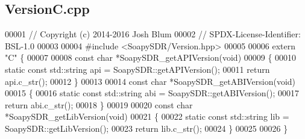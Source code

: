 \subsection{Version\+C.\+cpp}
\label{VersionC_8cpp_source}

\begin{DoxyCode}
00001 \textcolor{comment}{// Copyright (c) 2014-2016 Josh Blum}
00002 \textcolor{comment}{// SPDX-License-Identifier: BSL-1.0}
00003 
00004 \textcolor{preprocessor}{#include <SoapySDR/Version.hpp>}
00005 
00006 \textcolor{keyword}{extern} \textcolor{stringliteral}{"C"} \{
00007 
00008 \textcolor{keyword}{const} \textcolor{keywordtype}{char} *SoapySDR_getAPIVersion(\textcolor{keywordtype}{void})
00009 \{
00010     \textcolor{keyword}{static} \textcolor{keyword}{const} std::string api = SoapySDR::getAPIVersion();
00011     \textcolor{keywordflow}{return} api.c\_str();
00012 \}
00013 
00014 \textcolor{keyword}{const} \textcolor{keywordtype}{char} *SoapySDR_getABIVersion(\textcolor{keywordtype}{void})
00015 \{
00016     \textcolor{keyword}{static} \textcolor{keyword}{const} std::string abi = SoapySDR::getABIVersion();
00017     \textcolor{keywordflow}{return} abi.c\_str();
00018 \}
00019 
00020 \textcolor{keyword}{const} \textcolor{keywordtype}{char} *SoapySDR_getLibVersion(\textcolor{keywordtype}{void})
00021 \{
00022     \textcolor{keyword}{static} \textcolor{keyword}{const} std::string lib = SoapySDR::getLibVersion();
00023     \textcolor{keywordflow}{return} lib.c\_str();
00024 \}
00025 
00026 \}
\end{DoxyCode}
